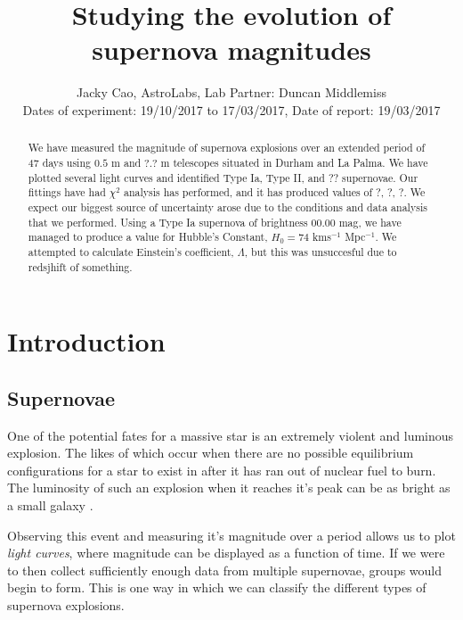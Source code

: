 \documentclass[twocolumn]{revtex4}
\begin{document}
\textheight=26.385cm

\title{Studying the evolution of supernova magnitudes}
 
\author{Jacky Cao, AstroLabs, Lab Partner: Duncan Middlemiss \\ Dates of experiment: 19/10/2017 to 17/03/2017, Date of report: 19/03/2017}

\begin{abstract}              
We have measured the magnitude of supernova explosions over an extended period of 47 days using $0.5$ m and $?.?$ m telescopes situated in Durham and La Palma. We have plotted several light curves and identified Type Ia, Type II, and ?? supernovae. Our fittings have had $\chi^2$ analysis has performed, and it has produced values of ?, ?, ?. We expect our biggest source of uncertainty arose due to the conditions and data analysis that we performed. Using a Type Ia supernova of brightness $00.00$ mag, we have managed to produce a value for Hubble's Constant, $H_0 = 74$ kms$^{-1}$ Mpc$^{-1}$. We attempted to calculate Einstein's coefficient, $\Lambda$, but this was unsuccesful due to redsjhift of something.
\end{abstract}

\maketitle

\vspace{-3ex}
\section{Introduction} 
\vspace{-2ex}
\subsection{Supernovae}
\vspace{-2ex}

One of the potential fates for a massive star is an extremely violent and luminous explosion. The likes of which occur when there are no possible equilibrium configurations for a star to exist in after it has ran out of nuclear fuel to burn. The luminosity of such an explosion when it reaches it's peak can be as bright as a small galaxy \cite{longair}.

Observing this event and measuring it's magnitude over a period allows us to plot {\em light curves\em}, where magnitude can be displayed as a function of time. If we were to then collect sufficiently enough data from multiple supernovae, groups would begin to form. This is one way in which we can classify the different types of supernova explosions. 
\end{document}
